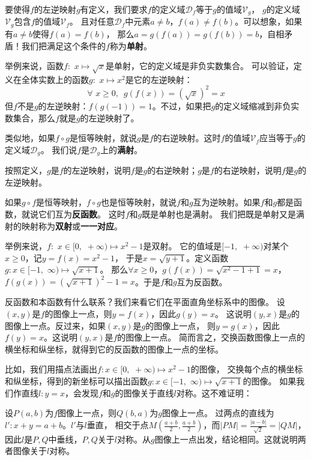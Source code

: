 \documentclass[12pt,UTF8]{ctexbook}
\begin{document}
要使得$f$的左逆映射$g$有定义，我们要求$f$的定义域$\mathcal{D}_f$等于$g$的值域$\mathcal{V}_g$，
$g$的定义域$\mathcal{V}_g$包含$f$的值域$\mathcal{V}_f$。
且对任意$\mathcal{D}_f$中元素$a \neq b$，$f(a) \neq f(b)$。可以想象，如果有$a \neq b$使得$f(a) = f(b)$，
那么$a = g(f(a)) = g(f(b)) = b$，自相矛盾！我们把满足这个条件的$f$称为\textbf{单射}。

举例来说，函数$f: \,\,x \mapsto \sqrt{x}$是单射，它的定义域是非负实数集合。
可以验证，定义在全体实数上的函数$g:\,\, x \mapsto x^2$是它的左逆映射：
$$ \forall \,\, x \geqslant 0, \,\,\, g(f(x)) = \left(\sqrt{x}\right)^2 = x$$
但$f$不是$g$的左逆映射：$f(g(-1)) = 1$。不过，如果把$g$的定义域缩减到非负实数集合，那么$f$就是$g$的左逆映射了。


类似地，如果$f\circ g$是恒等映射，就说$g$是$f$的右逆映射。这时$f$的值域$\mathcal{V}_f$应当等于$g$的定义域$\mathcal{D}_g$。
我们说$f$是$\mathcal{D}_g$上的\textbf{满射}。

按照定义，$g$是$f$的左逆映射，说明$f$是$g$的右逆映射；$g$是$f$的右逆映射，说明$f$是$g$的左逆映射。

如果$g\circ f$是恒等映射，$f\circ g$也是恒等映射，就说$f$和$g$互为逆映射。如果$f$和$g$都是函数，就说它们互为\textbf{反函数}。
这时$f$和$g$既是单射也是满射。
我们把既是单射又是满射的映射称为\textbf{双射}或\textbf{一一对应}。

举例来说，$f: \,\,x\in[0,\,\,+\infty) \mapsto x^2 - 1$是双射。
它的值域是$[-1,\,\,+\infty)$对某个$x\geqslant 0$，记$y = f(x) = x^2 - 1$，
于是$x = \sqrt{y + 1}$。定义函数$g:x\in[-1, \,\,\infty)\mapsto\sqrt{x + 1}$。
那么$\forall x \geqslant 0$，$g(f(x)) = \sqrt{x^2 - 1 + 1} = x$，
$f(g(x)) = \left(\sqrt{x + 1}\right)^2 - 1 = x$。于是$f$和$g$互为反函数。

反函数和本函数有什么联系？我们来看它们在平面直角坐标系中的图像。
设$(x, y)$是$f$的图像上一点，则$y = f(x)$，因此$g(y) = x$。
这说明$(y, x)$是$g$的图像上一点。反过来，如果$(x,y)$是$g$的图像上一点，
则$y = g(x)$，因此$f(y) = x$。这说明$(y, x)$是$f$的图像上一点。
简而言之，交换函数图像上一点的横坐标和纵坐标，就得到它的反函数的图像上一点的坐标。


比如，我们用描点法画出$f: x\in[0,\,\,+\infty) \mapsto x^2 - 1$的图像，
交换每个点的横坐标和纵坐标，得到的新坐标可以描出函数$g:x\in[-1, \,\,\infty)\mapsto\sqrt{x + 1}$的图像。
如果我们作直线$l: y = x$，会发现$f$和$g$的图像关于直线$l$对称。这不难证明：

设$P(a,b)$为$f$图像上一点，则$Q(b,a)$为$g$图像上一点。
过两点的直线为$l':x + y = a + b$。$l'$与$l$垂直，
相交于点$M(\frac{a+b}{2}, \frac{a+b}{2})$，而$|PM| = \frac{|a-b|}{\sqrt{2}} = |QM|$，
因此$l$是$P,Q$中垂线，$P,Q$关于$l$对称。从$g$图像上一点出发，结论相同。这就说明两者图像关于$l$对称。
\end{document}
